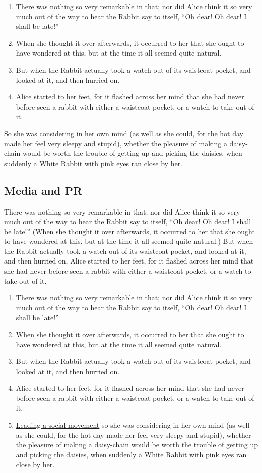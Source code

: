 \documentclass[12pt]{article}
\begin{document}
\begin{enumerate}
\item There was nothing so very remarkable in that; nor did Alice think it so very much out of the way to hear the Rabbit say to itself, ``Oh dear! Oh dear! I shall be late!''
\item When she thought it over afterwards, it occurred to her that she ought to have wondered at this, but at the time it all seemed quite natural.
\item But when the Rabbit actually took a watch out of its waistcoat-pocket, and looked at it, and then hurried on.
\item Alice started to her feet, for it flashed across her mind that she had never before seen a rabbit with either a waistcoat-pocket, or a watch to take out of it.
\end{enumerate}

So she was considering in her own mind (as well as she could, for the hot day made her feel very sleepy and stupid), whether the pleasure of making a daisy-chain would be worth the trouble of getting up and picking the daisies, when suddenly a White Rabbit with pink eyes ran close by her.

\subsection{Media and PR}
\label{sec-4-4}
There was nothing so very remarkable in that; nor did Alice think it so very much out of the way to hear the Rabbit say to itself, ``Oh dear! Oh dear! I shall be late!'' (When she thought it over afterwards, it occurred to her that she ought to have wondered at this, but at the time it all seemed quite natural.) But when the Rabbit actually took a watch out of its waistcoat-pocket, and looked at it, and then hurried on, Alice started to her feet, for it flashed across her mind that she had never before seen a rabbit with either a waistcoat-pocket, or a watch to take out of it. 

\begin{enumerate}
\item There was nothing so very remarkable in that; nor did Alice think it so very much out of the way to hear the Rabbit say to itself, ``Oh dear! Oh dear! I shall be late!''
\item When she thought it over afterwards, it occurred to her that she ought to have wondered at this, but at the time it all seemed quite natural.
\item But when the Rabbit actually took a watch out of its waistcoat-pocket, and looked at it, and then hurried on.
\item Alice started to her feet, for it flashed across her mind that she had never before seen a rabbit with either a waistcoat-pocket, or a watch to take out of it.
\item \href{http://jaydixit.com}{Leading a social movement} so she was considering in her own mind (as well as she could, for the hot day made her feel very sleepy and stupid), whether the pleasure of making a daisy-chain would be worth the trouble of getting up and picking the daisies, when suddenly a White Rabbit with pink eyes ran close by her.
\end{enumerate}
\end{document}
